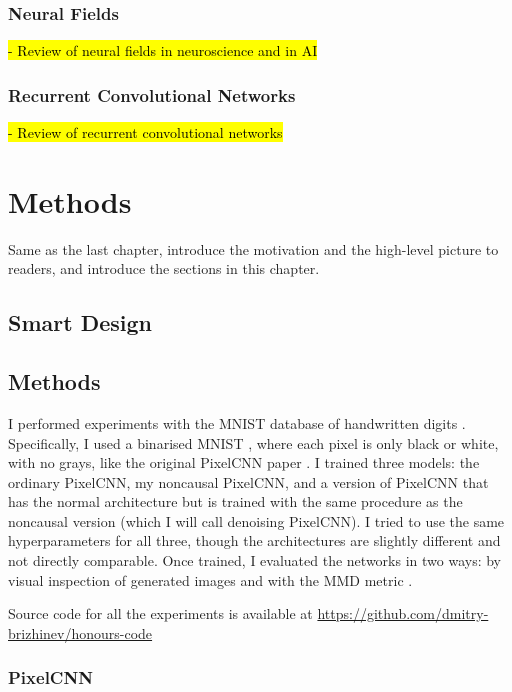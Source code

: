 \documentclass[11pt, a4paper]{book}
\begin{document}
\subsection{Neural Fields}

\hl{- Review of neural fields in neuroscience and in AI}

\subsection{Recurrent Convolutional Networks}

\hl{- Review of recurrent convolutional networks}
\citet{videopixel}


\chapter{Methods}
\label{cha:methods}
Same as the last chapter, introduce the motivation and the high-level picture to
readers, and introduce the sections in this chapter.


\section{Smart Design}
\label{sec:des-hotpath}

\section{Methods}

I performed experiments with the MNIST database of handwritten digits \citep{mnist}. Specifically, I used a binarised MNIST \citep{binarisedmnist}, where each pixel is only black or white, with no grays, like the original PixelCNN paper \citep{pixelcnn1}. I trained three models: the ordinary PixelCNN, my noncausal PixelCNN, and a version of PixelCNN that has the normal architecture but is trained with the same procedure as the noncausal version (which I will call denoising PixelCNN). I tried to use the same hyperparameters for all three, though the architectures are slightly different and not directly comparable. Once trained, I evaluated the networks in two ways: by visual inspection of generated images and with the MMD metric \citep{mmd,ganmetrics}.

Source code for all the experiments is available at \url{https://github.com/dmitry-brizhinev/honours-code}

\subsection{PixelCNN}
\end{document}
